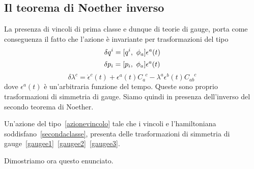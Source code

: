 \subsection{Il teorema di Noether inverso}
    La presenza di vincoli di prima classe e dunque di teorie di gauge, porta come conseguenza il fatto che l'azione è invariante per trasformazioni del tipo
    \begin{equation} \label{gaugee1}
        \delta q^i = [q^i, ~\phi_a] \epsilon^a (t)
    \end{equation}
    \begin{equation}\label{gaugee2}
        \delta p_i = [p_i, ~\phi_a] \epsilon^a (t)
    \end{equation}
    \begin{equation}\label{gaugee3}
        \delta \lambda^c = \dot \epsilon^c (t) + \epsilon^a(t) C_a^{\phantom a c} - \lambda^a \epsilon^b(t) C_{ab}^{\phantom{ab} c}
    \end{equation}
    dove $\epsilon^a(t)$ è un'arbitraria funzione del tempo. Queste sono proprio trasformazioni di simmetria di gauge. Siamo quindi in presenza dell'inverso del secondo teorema di Noether.
    \begin{theorem}
        Un'azione del tipo~\eqref{azionevincolo} tale che i vincoli e l'hamiltoniana soddisfano~\eqref{secondaclasse}, presenta delle trasformazioni di simmetria di gauge~\eqref{gaugee1}~\eqref{gaugee2}~\eqref{gaugee3}.
    \end{theorem}
    Dimostriamo ora questo enunciato. 
